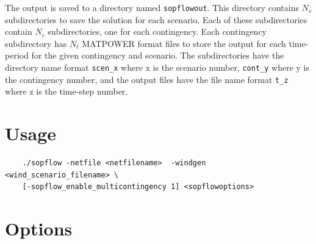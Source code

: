 The \sopflow output is saved to a directory named \texttt{sopflowout}. This
directory contains $N_s$ subdirectories to save the solution for each scenario.
Each of these subdirectories contain $N_c$ subdirectories, one for each
contingency. Each contingency subdirectory has $N_t$ MATPOWER format files to
store the output for each time-period for the given contingency and scenario.
The subdirectories have the directory name format \texttt{scen_x} where x is
the scenario number,  \texttt{cont_y} where y is the contingency number, and
the output files have the file name format \texttt{t_z} where z is the time-step number.

\section{Usage}
\begin{lstlisting}
    ./sopflow -netfile <netfilename>  -windgen <wind_scenario_filename> \
    [-sopflow_enable_multicontingency 1] <sopflowoptions>
\end{lstlisting}

\section{Options}

